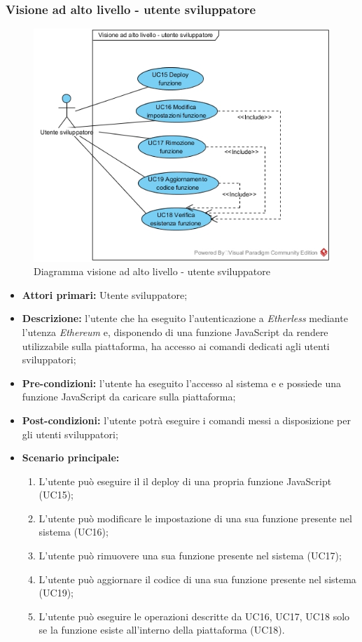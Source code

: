 \subsubsection{Visione ad alto livello - utente sviluppatore}
\begin{figure}[h]
	\centering
	\includegraphics[width=\linewidth]{res/img/utenteSviluppatore.jpg}
	\caption{Diagramma visione ad alto livello - utente sviluppatore}
\end{figure}
\begin{itemize}
	\item \textbf{Attori primari:} Utente sviluppatore;
	\item \textbf{Descrizione:} l'utente che ha eseguito l'autenticazione a \textit{Etherless} mediante l'utenza \textit{Ethereum\glo} e, disponendo di una funzione JavaScript da rendere utilizzabile sulla piattaforma, ha accesso ai comandi dedicati agli utenti sviluppatori; 
	\item \textbf{Pre-condizioni:} l'utente ha eseguito l'accesso al sistema e e possiede una funzione JavaScript da caricare sulla piattaforma; 
	\item \textbf{Post-condizioni:} l'utente potrà eseguire i comandi messi a disposizione per gli utenti sviluppatori;
	\item \textbf{Scenario principale:} 
	\begin{enumerate}
		\item L'utente può eseguire il il deploy di una propria funzione JavaScript (UC15);
		\item L'utente può modificare le impostazione di una sua funzione presente nel sistema (UC16);
		\item L'utente può rimuovere una sua funzione presente nel sistema (UC17);
		\item L'utente può aggiornare il codice di una sua funzione presente nel sistema (UC19);
		\item L'utente può eseguire le operazioni descritte da UC16, UC17, UC18 solo se la funzione esiste all'interno della piattaforma (UC18).
	\end{enumerate}
\end{itemize}